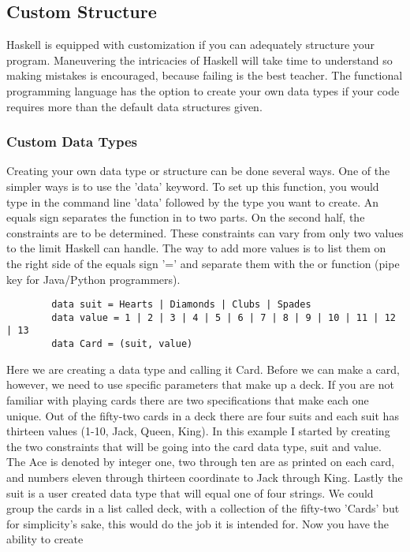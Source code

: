 \documentclass{article}
\begin{document}
\subsection{Custom Structure}
Haskell is equipped with customization if you can adequately structure your program. Maneuvering the intricacies of Haskell will take time to understand so making mistakes is encouraged, because failing is the best teacher. The functional programming language has the option to create your own data types if your code requires more than the default data structures given. 

    \subsubsection{Custom Data Types}
    Creating your own data type or structure can be done several ways. One of the simpler ways is to use the 'data' keyword. To set up this function, you would type in the command line 'data' followed by the type you want to create. An equals sign separates the function in to two parts. On the second half, the constraints are to be determined. These constraints can vary from only two values to the limit Haskell can handle. The way to add more values is to list them on the right side of the equals sign '=' and separate them with the or function (pipe key for Java/Python programmers).
    
    \begin{lstlisting}
        data suit = Hearts | Diamonds | Clubs | Spades 
        data value = 1 | 2 | 3 | 4 | 5 | 6 | 7 | 8 | 9 | 10 | 11 | 12 | 13  
        data Card = (suit, value)
    \end{lstlisting}
    
    Here we are creating a data type and calling it Card. Before we can make a card, however, we need to use specific parameters that make up a deck. If you are not familiar with playing cards there are two specifications that make each one unique. Out of the fifty-two cards in a deck there are four suits and each suit has thirteen values (1-10, Jack, Queen, King). In this example I started by creating the two constraints that will be going into the card data type, suit and value. The Ace is denoted by integer one, two through ten are as printed on each card, and numbers eleven through thirteen coordinate to Jack through King. Lastly the suit is a user created data type that will equal one of four strings. We could group the cards in a list called deck, with a collection of the fifty-two 'Cards' but for simplicity's sake, this would do the job it is intended for. Now you have the ability to create
    
\end{document}

